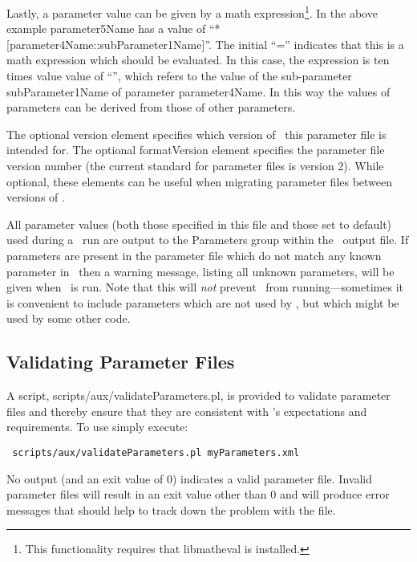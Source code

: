 Lastly, a parameter value can be given by a math expression\footnote{This functionality requires that {\normalfont \ttfamily libmatheval} is installed.}. In the above example {\normalfont \ttfamily parameter5Name} has a value of ``{\normalfont {}*[parameter4Name::subParameter1Name]}''. The initial ``{\normalfont \ttfamily =}'' indicates that this is a math expression which should be evaluated. In this case, the expression is ten times value value of ``{\normalfont {}}'', which refers to the value of the sub-parameter {\normalfont \ttfamily subParameter1Name} of parameter {\normalfont \ttfamily parameter4Name}. In this way the values of parameters can be derived from those of other parameters.

The optional {\normalfont \ttfamily version} element specifies which version of \glc\ this parameter file is intended for. The optional {\normalfont \ttfamily formatVersion} element specifies the parameter file version number (the current standard for parameter files is version 2). While optional, these elements can be useful when migrating parameter files between versions of \glc.

All parameter values (both those specified in this file and those set to default) used during a \glc\ run are output to the {\normalfont \ttfamily Parameters} group within the \glc\ output file. If parameters are present in the parameter file which do not match any known parameter in \glc\ then a warning message, listing all unknown parameters, will be given when \glc\ is run. Note that this will \emph{not} prevent \glc\ from running---sometimes it is convenient to include parameters which are not used by \glc, but which might be used by some other code.

\subsection{Validating Parameter Files}

A script, {\normalfont \ttfamily scripts/aux/validateParameters.pl}, is provided to validate parameter files and thereby ensure that they are consistent with \glc's expectations and requirements. To use simply execute:
\begin{verbatim}
 scripts/aux/validateParameters.pl myParameters.xml
\end{verbatim}
No output (and an exit value of 0) indicates a valid parameter file. Invalid parameter files will result in an exit value other than 0 and will produce error messages that should help to track down the problem with the file.

